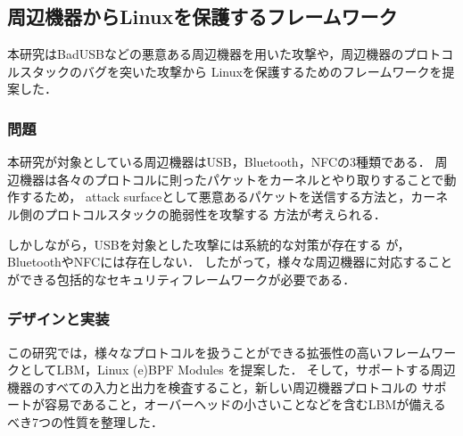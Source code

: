 \documentclass[platex,a4j,10pt,twoside,twocolumn,dvipdfmx]{jsarticle}
\begin{document}
\subsection{周辺機器からLinuxを保護するフレームワーク\cite{tian2019lbm}}
本研究はBadUSBなどの悪意ある周辺機器を用いた攻撃や，周辺機器のプロトコルスタックのバグを突いた攻撃から
Linuxを保護するためのフレームワークを提案した．

\subsubsection{問題}
本研究が対象としている周辺機器はUSB，Bluetooth，NFCの3種類である．
周辺機器は各々のプロトコルに則ったパケットをカーネルとやり取りすることで動作するため，
attack surfaceとして悪意あるパケットを送信する方法と，カーネル側のプロトコルスタックの脆弱性を攻撃する
方法が考えられる．

しかしながら，USBを対象とした攻撃には系統的な対策が存在する \cite{tian2016making}が，
BluetoothやNFCには存在しない．
したがって，様々な周辺機器に対応することができる包括的なセキュリティフレームワークが必要である．

\subsubsection{デザインと実装}
この研究では，様々なプロトコルを扱うことができる拡張性の高いフレームワークとしてLBM，Linux (e)BPF Modules
を提案した．
そして，サポートする周辺機器のすべての入力と出力を検査すること，新しい周辺機器プロトコルの
サポートが容易であること，オーバーヘッドの小さいことなどを含むLBMが備えるべき7つの性質を整理した．
\end{document}
